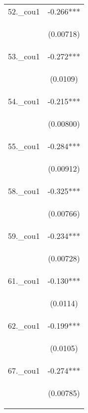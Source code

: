 \documentclass[]{article}
\begin{document}
\begin{center}
\begin{tabular}{lc}
52.\_cou1 & -0.266*** \\
\vspace{4pt} & \begin{footnotesize}(0.00718)\end{footnotesize} \\
53.\_cou1 & -0.272*** \\
\vspace{4pt} & \begin{footnotesize}(0.0109)\end{footnotesize} \\
54.\_cou1 & -0.215*** \\
\vspace{4pt} & \begin{footnotesize}(0.00800)\end{footnotesize} \\
55.\_cou1 & -0.284*** \\
\vspace{4pt} & \begin{footnotesize}(0.00912)\end{footnotesize} \\
58.\_cou1 & -0.325*** \\
\vspace{4pt} & \begin{footnotesize}(0.00766)\end{footnotesize} \\
59.\_cou1 & -0.234*** \\
\vspace{4pt} & \begin{footnotesize}(0.00728)\end{footnotesize} \\
61.\_cou1 & -0.130*** \\
\vspace{4pt} & \begin{footnotesize}(0.0114)\end{footnotesize} \\
62.\_cou1 & -0.199*** \\
\vspace{4pt} & \begin{footnotesize}(0.0105)\end{footnotesize} \\
67.\_cou1 & -0.274*** \\
\vspace{4pt} & \begin{footnotesize}(0.00785)\end{footnotesize} \\

\end{tabular}
\end{center}
\end{document}
